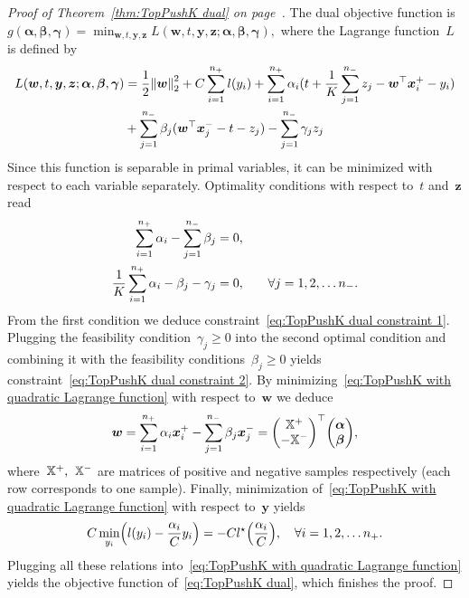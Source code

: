 \begin{proof}[Proof of Theorem~\ref{thm:TopPushK dual} on page~\pageref{thm:TopPushK dual}]
  The dual objective function is~$g(\bm{\alpha}, \bm{\beta}, \bm{\gamma}) = \min_{\bm{w}, t, \bm{y}, \bm{z}} L(\bm{w}, t, \bm{y}, \bm{z}; \bm{\alpha}, \bm{\beta}, \bm{\gamma}),$ where the Lagrange function~$L$ is defined by
  \begin{equation}\label{eq:TopPushK with quadratic Lagrange function}
    \begin{aligned}
      L(\bm{w}, t, \bm{y}, \bm{z}; \bm{\alpha}, \bm{\beta}, \bm{\gamma})
      & = \frac{1}{2} \norm{\bm{w}}_{2}^{2}
        + C \sum_{i = 1}^{\npos} l(y_i)
        + \sum_{i = 1}^{\npos} \alpha_i(t + \frac{1}{K} \sum_{j = 1}^{\nneg} z_j - \bm{w}^\top\bm{x}^+_i - y_i) \\ 
      & + \sum_{j = 1}^{\nneg} \beta_j (\bm{w}^{\top}\bm{x}^-_j - t - z_j)
        - \sum_{j = 1}^{\nneg} \gamma_j z_j
    \end{aligned}
  \end{equation}
  Since this function is separable in primal variables, it can be minimized with respect to each variable separately. Optimality conditions with respect to~$t$ and~$\bm{z}$ read
  \begin{alignat*}{2}
    \sum_{i = 1}^{n_{+}} \alpha_i - \sum_{j = 1}^{n_{-}} \beta_j     & = 0, \\
    \frac{1}{K} \sum_{i = 1}^{n_{+}} \alpha_i - \beta_j - \gamma_j & = 0, & \quad \forall j = 1, 2, \ldots n_{-}.
  \end{alignat*}
  From the first condition we deduce constraint~\eqref{eq:TopPushK dual constraint 1}. Plugging the feasibility condition~$\gamma_j \geq 0$ into the second optimal condition and combining it with the feasibility conditions~$\beta_j \geq 0$ yields constraint~\eqref{eq:TopPushK dual constraint 2}. By minimizing~\eqref{eq:TopPushK with quadratic Lagrange function} with respect to~$\bm{w}$ we deduce
  \begin{equation*}
    \bm{w}
        = \sum_{i = 1}^{\npos} \alpha_i \bm{x}^+_i - \sum_{j = 1}^{\nneg} \beta_j \bm{x}^-_j
        = \Matrix{\X^+ \\ - \X^-}^\top \Matrix{\bm{\alpha} \\ \bm{\beta}},
  \end{equation*}
  where~$\mathbb{X}^+,$~$\mathbb{X}^-$ are matrices of positive and negative samples respectively (each row corresponds to one sample). Finally, minimization of~\eqref{eq:TopPushK with quadratic Lagrange function} with respect to~$\bm{y}$ yields
  \begin{equation*}
    C \min_{y_i} \Brac{l(y_i) - \frac{\alpha_i}{C} y_i} = - C l^{\star} \Brac{\frac{\alpha_i}{C}}, \quad \forall i = 1, 2, \ldots \npos.
  \end{equation*}
  Plugging all these relations into~\eqref{eq:TopPushK with quadratic Lagrange function} yields the objective function of~\eqref{eq:TopPushK dual}, which finishes the proof.
\end{proof}

